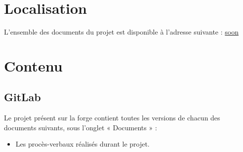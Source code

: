 \section{Localisation}

	L’ensemble des documents du projet est disponible à l’adresse suivante :
	\url{soon}

\section{Contenu}

	\subsection{GitLab}

	Le projet présent sur la forge contient toutes les versions de chacun des documents suivants, sous l’onglet « Documents » :
	\begin{itemize}
		\item Les procès-verbaux réalisés durant le projet.
	\end{itemize}
